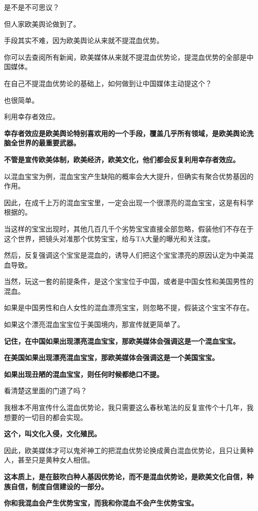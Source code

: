 \documentclass[UTF8, 11pt, oneside]{ctexart}
\newcommand{\zd}[1]{\textbf{\textcolor[RGB]{123,12,0}{#1}}} %
\begin{document}
是不是不可思议？

但人家欧美舆论做到了。

手段其实不难，因为欧美舆论从来就不提混血优势。

你可以去查阅所有新闻，欧美媒体从来就不提混血优势论，提混血优势的全部是中国媒体。

在自己不提混血优势论的基础上，如何做到让中国媒体主动提这个？

也很简单。

利用幸存者效应。

\zd{幸存者效应是欧美舆论特别喜欢用的一个手段，覆盖几乎所有领域，是欧美舆论洗脑全世界的最重要武器。}

\zd{不管是宣传欧美体制，欧美经济，欧美文化，他们都会反复利用幸存者效应。}

以混血宝宝为例，混血宝宝产生缺陷的概率会大大提升，但确实有聚合优势基因的作用。

因此，在成千上万的混血宝宝里，一定会出现一个很漂亮的混血宝宝，这是有科学根据的。

当这样的宝宝出现时，其他几百几千个劣势宝宝直接全部忽略，假装他们不存在于这个世界，把镜头对准那个优势宝宝，给与TA大量的曝光和关注度。

然后，反复强调这个宝宝是混血的，诱导人们把这个宝宝漂亮的原因认定为中美混血导致。

当然，玩这一套的前提条件，是这个宝宝位于中国，或者是中国女性和美国男性的混血。

如果是中国男性和白人女性的混血漂亮宝宝，则忽略不提，假装这个宝宝不存在。

如果这个漂亮混血宝宝位于美国境内，那宣传就更简单了。

\zd{记住，在中国如果出现漂亮混血宝宝，那欧美媒体会强调这是一个混血宝宝。}

\zd{在美国如果出现漂亮混血宝宝，那欧美媒体会强调这是一个美国宝宝。}

\zd{如果出现丑陋的混血宝宝，则任何时候都绝口不提。}

看清楚这里面的门道了吗？

我根本不用宣传什么混血优势论，我只需要这么春秋笔法的反复宣传个十几年，我想要的一切目的都会实现。

\zd{这个，叫文化入侵，文化殖民。}


因此，欧美媒体才可以鬼斧神工的把混血优势论换成黄白混血优势论，且只让黄种人，甚至只是黄种女人相信。

\zd{这本质上，是在鼓吹白种人基因优势论，而不是混血优势论，是欧美文化自信，种族自信，制度自信建设的一部分。}

\zd{你和我混血会产生优势宝宝，而我和你混血不会产生优势宝宝。}
\end{document}

